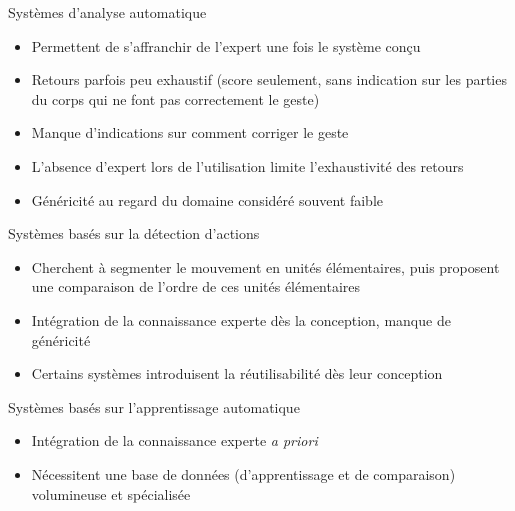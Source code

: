     \begin{frame}{\subsecname}
        \begin{block}{Systèmes d'analyse automatique}
            \begin{itemize}[label=$\bullet$]
                \item Permettent de s'affranchir de l'expert une fois le système conçu
                \item Retours parfois peu exhaustif (score seulement, sans indication sur les parties du corps qui ne font pas correctement le geste)
                \item Manque d'indications sur comment corriger le geste
                \item L'absence d'expert lors de l'utilisation limite l'exhaustivité des retours
                \item Généricité au regard du domaine considéré souvent faible
            \end{itemize}
        \end{block}
        
        \begin{block}{Systèmes basés sur la détection d'actions}
            \begin{itemize}[label=$\bullet$]
                \item Cherchent à segmenter le mouvement en unités élémentaires, puis proposent une comparaison de l'ordre de ces unités élémentaires
                \item Intégration de la connaissance experte dès la conception, manque de généricité
                \item Certains systèmes introduisent la réutilisabilité dès leur conception 
            \end{itemize}
        \end{block}
        
        \begin{block}{Systèmes basés sur l'apprentissage automatique}
            \begin{itemize}[label=$\bullet$]
                \item Intégration de la connaissance experte \textit{a priori}
                \item Nécessitent une base de données (d'apprentissage et de comparaison) volumineuse et spécialisée
            \end{itemize}
        \end{block}
    \end{frame}
    
